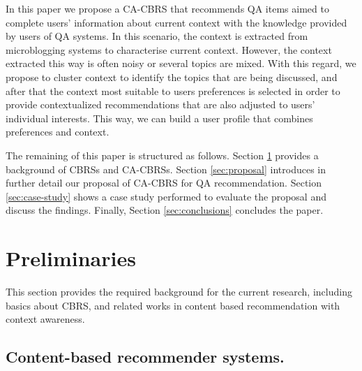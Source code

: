 \documentclass[preprint]{elsarticle}
\begin{document}
\begin{spacing}{1.5}
In this paper we propose a CA-CBRS that recommends QA items aimed to complete users' information about current context with the knowledge provided by users of QA systems. In this scenario, the context is extracted from microblogging systems to characterise current context. However, the context extracted this way is often noisy or several topics are mixed. With this regard, we propose to cluster context to identify the topics that are being discussed, and after that the context most suitable to users preferences is selected in order to provide contextualized recommendations that are also adjusted to users' individual interests. This way, we can build a user profile that combines preferences and context.

The remaining of this paper is structured as follows. Section \ref{sec:preliminaries} provides a background of CBRSs and CA-CBRSs. Section \ref{sec:proposal} introduces in further detail our proposal of CA-CBRS for QA recommendation. Section \ref{sec:case-study} shows a case study performed to evaluate the proposal and discuss the findings. Finally, Section \ref{sec:conclusions} concludes the paper.



\section{Preliminaries}
\label{sec:preliminaries}

This section provides the required background for the current research, including basics about CBRS, and related works in content based recommendation with context awareness.

\subsection{Content-based recommender systems.}


\end{spacing}
\end{document}
